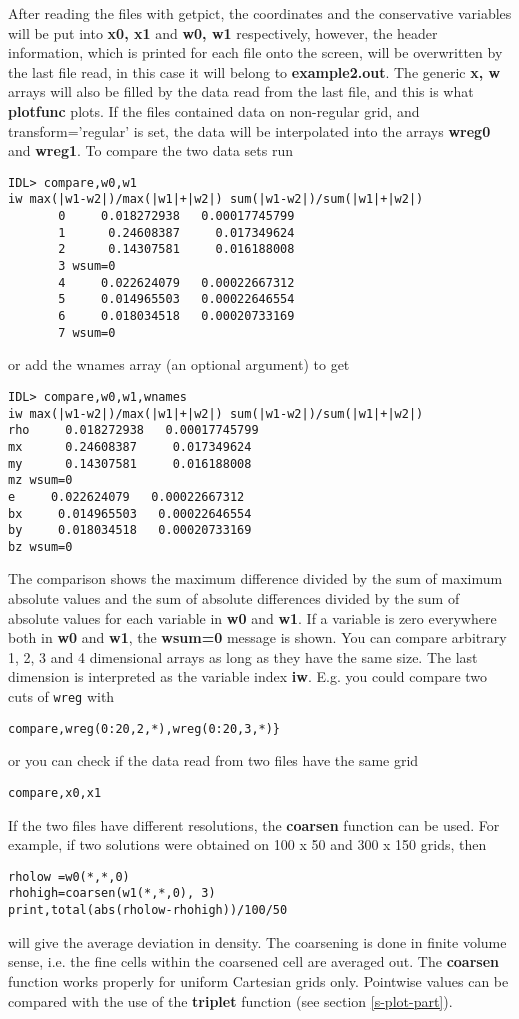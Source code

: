    After reading the files with getpict, 
   the coordinates and the conservative variables 
   will be put into {\bf x0, x1} and {\bf w0, w1} respectively, however, 
   the header information, which is printed for each file onto the screen, 
   will be overwritten by the last file read, in this case it will belong to
   {\bf example2.out}. The generic {\bf x, w} arrays will also be
   filled by the data read from the last file, and this is what 
   {\bf plotfunc} plots. If the files contained data on non-regular grid,
   and transform='regular' is set, the data will be interpolated into 
   the arrays {\bf wreg0} and {\bf wreg1}. 
   To compare the two data sets run
\begin{verbatim}
IDL> compare,w0,w1
iw max(|w1-w2|)/max(|w1|+|w2|) sum(|w1-w2|)/sum(|w1|+|w2|)
       0     0.018272938   0.00017745799
       1      0.24608387     0.017349624
       2      0.14307581     0.016188008
       3 wsum=0
       4     0.022624079   0.00022667312
       5     0.014965503   0.00022646554
       6     0.018034518   0.00020733169
       7 wsum=0
\end{verbatim}
or add the wnames array (an optional argument) to get
\begin{verbatim}
IDL> compare,w0,w1,wnames
iw max(|w1-w2|)/max(|w1|+|w2|) sum(|w1-w2|)/sum(|w1|+|w2|)
rho     0.018272938   0.00017745799
mx      0.24608387     0.017349624
my      0.14307581     0.016188008
mz wsum=0
e     0.022624079   0.00022667312
bx     0.014965503   0.00022646554
by     0.018034518   0.00020733169
bz wsum=0
\end{verbatim}
   The comparison shows the maximum difference divided by the sum of maximum 
   absolute
   values and the sum of absolute differences divided by the sum of absolute
   values for each variable in {\bf w0} and {\bf w1}. If a variable is zero
   everywhere both in {\bf w0} and {\bf w1}, the {\bf wsum=0} message is shown.
   You can compare arbitrary 1, 2, 3 and 4 dimensional arrays as long as they 
   have the same size.
   The last dimension is interpreted as the variable index {\bf iw}.
   E.g. you could compare two cuts of {\tt wreg} with
\begin{verbatim}
compare,wreg(0:20,2,*),wreg(0:20,3,*)}
\end{verbatim}
   or you can check if the data read from two files have the same grid
\begin{verbatim}
compare,x0,x1
\end{verbatim}
   If the two files have different resolutions, the {\bf coarsen} 
   function can be used. For example, if two solutions were obtained on 
   100 x 50 and 300 x 150 grids, then 
\begin{verbatim}
rholow =w0(*,*,0)
rhohigh=coarsen(w1(*,*,0), 3)
print,total(abs(rholow-rhohigh))/100/50
\end{verbatim}
   will give the average deviation in density. The coarsening is done in
   finite volume sense, i.e. the fine cells within the coarsened cell are
   averaged out. The {\bf coarsen} function works properly for
   uniform Cartesian grids only. Pointwise values can be compared
   with the use of the {\bf triplet} function (see section \ref{s-plot-part}).


